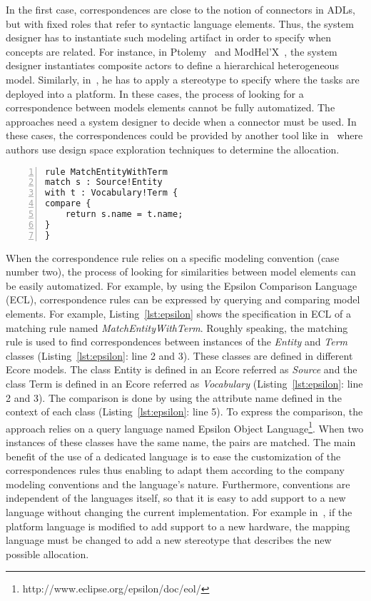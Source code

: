 In the first case, correspondences are close to the notion of connectors in ADLs, but with fixed roles that refer to syntactic language elements. Thus, the system designer has to instantiate such modeling artifact in order to specify when concepts are related. For instance, in Ptolemy~\cite{ptoleframebib} and ModHel'X~\cite{modhelxbib}, the system designer instantiates composite actors to define a hierarchical heterogeneous model. Similarly, in~\cite{dinatale}, he has to apply a stereotype to specify where the tasks are deployed into a platform. In these cases, the process of looking for a correspondence between models elements cannot be fully automatized. The approaches need a system designer to decide when a connector must be used. In these cases, the correspondences could be provided by another tool like in~\cite{kofmanbib} where authors use design space exploration techniques to determine the allocation.%
	\begin{lstlisting}[language=epsilon,
	caption={Matching rule in the Epsilon Comparison Language},
	label={lst:epsilon}, 
	basicstyle=\scriptsize\ttfamily, backgroundcolor=\color{LGrey}, numbers=left, xleftmargin=2pt]
rule MatchEntityWithTerm
match s : Source!Entity
with t : Vocabulary!Term {
compare {
	return s.name = t.name;
}
}
\end{lstlisting}
	
When the correspondence rule relies on a specific modeling convention (case number two), the process of looking for similarities between model elements can be easily automatized. For example, by using the Epsilon Comparison Language (ECL), correspondence rules can be expressed by querying and comparing model elements. For example, Listing~\ref{lst:epsilon} shows the specification in ECL of a matching rule named \emph{MatchEntityWithTerm}. Roughly speaking, the matching rule is used to find correspondences between instances of the \emph{Entity} and \emph{Term} classes (Listing~\ref{lst:epsilon}: line 2 and 3). These classes are defined in different Ecore models. The class Entity is defined in an Ecore referred as \emph{Source} and the class Term is defined in an Ecore referred as \emph{Vocabulary} (Listing~\ref{lst:epsilon}: line 2 and 3). The comparison is done by using the attribute name defined in the context of each class (Listing~\ref{lst:epsilon}: line 5). To express the comparison, the approach relies on a query language named Epsilon Object Language\footnote{http://www.eclipse.org/epsilon/doc/eol/}. When two instances of these classes have the same name, the pairs are matched. The main benefit of the use of a dedicated language is to ease the customization of the correspondences rules thus enabling to adapt them according to the company modeling conventions and the language's nature. Furthermore, conventions are independent of the languages itself, so that it is easy to add support to a new language without changing the current implementation. For example in~\cite{dinatale}, if the platform language is modified to add support to a new hardware, the mapping language must be changed to add a new stereotype that describes the new possible allocation.


